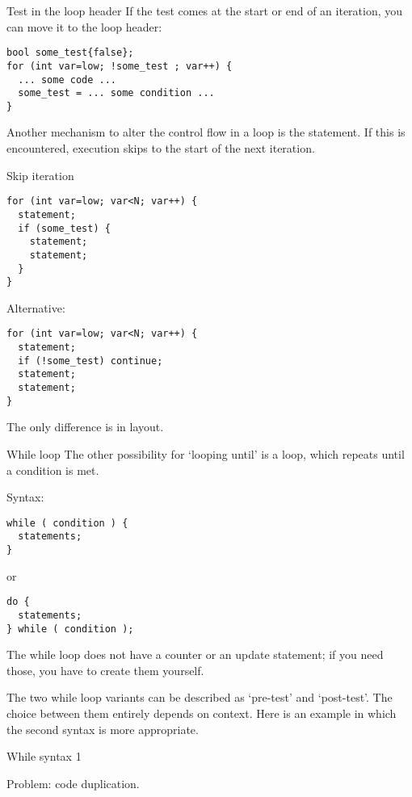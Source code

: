 \begin{block}{Test in the loop header}
  \label{sl:looptest}
  If the test comes at the start or end of an iteration, you can move it
  to the loop header:
\begin{lstlisting}
bool some_test{false};
for (int var=low; !some_test ; var++) {
  ... some code ...
  some_test = ... some condition ...
}
\end{lstlisting}
\end{block}

Another mechanism to alter the control flow in a loop is the
 statement. If this is encountered, execution
skips to the start of the next iteration.

\begin{block}{Skip iteration}
  \label{sl:for-cont}
\begin{lstlisting}
for (int var=low; var<N; var++) {
  statement;
  if (some_test) {
    statement;
    statement;
  }
}
\end{lstlisting}
Alternative:
\begin{lstlisting}
for (int var=low; var<N; var++) {
  statement;
  if (!some_test) continue;
  statement;
  statement;
}
\end{lstlisting}
The only difference is in layout.
\end{block}

\begin{block}{While loop}
  \label{sl:while}
  The other possibility for `looping until' is a
   loop, which repeats until a condition is met.

  Syntax:
\begin{lstlisting}
while ( condition ) {
  statements;
}
\end{lstlisting}
or
\begin{lstlisting}
do {
  statements;
} while ( condition );
\end{lstlisting}
The while loop does not have a counter or an update statement; if you
need those, you have to create them yourself.
\end{block}

The two while loop variants can be described as `pre-test' and
`post-test'. The choice between them entirely depends on context. Here
is an example in which the second syntax is more appropriate.

\begin{block}{While syntax 1}
  \label{sl:while2}

  Problem: code duplication.
\end{block}

